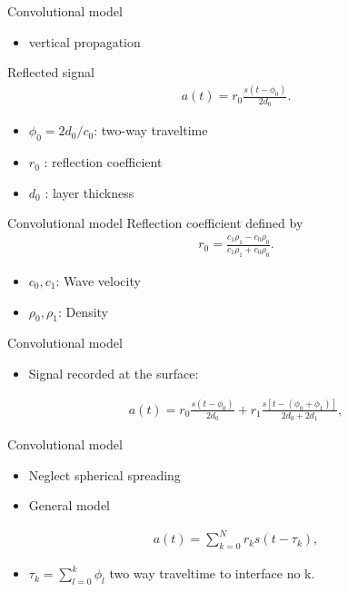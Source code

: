 \documentclass[xcolor=dvipsnames,notes]{beamer}
\begin{document}
%
\begin{frame}{Convolutional model}
\begin{itemize}
 \item vertical propagation
\end{itemize}
%
Reflected signal
\begin{eqnarray}
 a(t)=r_0\frac{s(t-\phi_0)}{2d_0}
\label{eq:3-60}.
\end{eqnarray}
\begin{itemize}
 \item $\phi_0 = 2 d_0/c_0$: two-way traveltime 
 \item $r_0$ : reflection coefficient
 \item $d_0$ : layer thickness
\end{itemize}
\end{frame}
%
\begin{frame}{Convolutional model}
Reflection coefficient defined by
\begin{eqnarray}
 r_0 =\frac{c_1\rho_1-c_0\rho_0}{c_1\rho_1+c_0\rho_0}.
\label{eq:3-61}
\end{eqnarray}
\begin{itemize}
  \item $c_0, c_1$: Wave velocity
  \item $\rho_0, \rho_1$: Density
\end{itemize}
\end{frame}
%
\begin{frame}{Convolutional model}
\begin{itemize}
\item Signal recorded at the surface:
\end{itemize}
%
\begin{eqnarray}
 a(t)=r_0\frac{s(t-\phi_0)}{2d_0} + r_1\frac{s[t-(\phi_0 + \phi_1)]}{2d_0+2d_1},
\label{eq:3-62}
\end{eqnarray}
%
\end{frame}
%
\begin{frame}{Convolutional model}
\begin{itemize}
 \item Neglect spherical spreading
 \item General model
\end{itemize}
%
\begin{eqnarray}
 a(t) = \sum^N_{k=0} r_k s(t-\tau_k),
\label{eq:3-63}
\end{eqnarray}
\begin{itemize}
 \item $\tau_k = \sum^k_{l=0} \phi_l$ two way traveltime to interface no k.
\end{itemize}
\end{frame}
\end{document}
